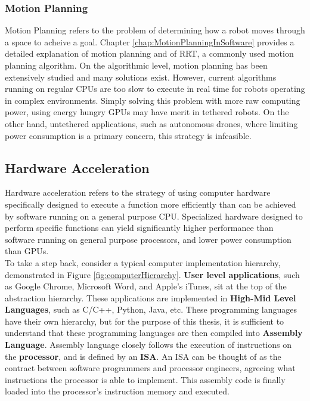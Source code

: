         

    \subsubsection*{Motion Planning}
        
        Motion Planning refers to the problem of determining how a robot moves through a space to acheive a goal. Chapter \ref{chap:MotionPlanningInSoftware} provides a detailed explanation of motion planning and of \ac{RRT}, a commonly used motion planning algorithm.
        \newline
        On the algorithmic level, motion planning has been extensively studied and many solutions exist. However, current algorithms running on regular \ac{CPU}s are too slow to execute in real time for robots operating in complex environments. Simply solving this problem with more raw computing power, using energy hungry \ac{GPU}s may have merit in tethered robots. On the other hand, untethered applications, such as autonomous drones, where limiting power consumption is a primary concern, this strategy is infeasible.
        
    \subsection*{Hardware Acceleration}
        Hardware acceleration refers to the strategy of using computer hardware specifically designed to execute a function more efficiently than can be achieved by software running on a general purpose \ac{CPU}.
        Specialized hardware designed to perform specific functions can yield significantly higher performance than software running on general purpose processors, and lower power consumption than \ac{GPU}s. \\
        To take a step back, consider a typical computer implementation hierarchy, demonstrated in Figure \ref{fig:computerHierarchy}. \textbf{User level applications}, such as Google Chrome, Microsoft Word, and Apple's iTunes, sit at the top of the abstraction hierarchy. These applications are implemented in \textbf{High-Mid Level Languages}, such as C/C++, Python, Java, etc. These programming languages have their own hierarchy, but for the purpose of this thesis, it is sufficient to understand that these programming languages are then compiled into \textbf{Assembly Language}. Assembly language closely follows the execution of instructions on the \textbf{processor}, and is defined by an \textbf{\ac{ISA}}. An \ac{ISA} can be thought of as the contract between software programmers and processor engineers, agreeing what instructions the processor is able to implement. This assembly code is finally loaded into the processor's instruction memory and executed. 
        

